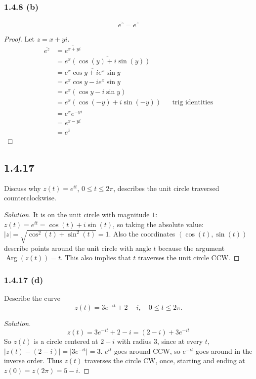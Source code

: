 \documentclass{article}
\newenvironment{solution}{
\begin{proof}[Solution]}{
\end{proof}}
\begin{document}
\subsubsection*{1.4.8 (b)}
\[
  \overline{e^z} = e^{\bar{z}}
\]
\begin{proof}
  Let $z = x + yi$.
  \begin{align*}
    \overline{e^z} &= \overline{e^{x + yi}}
    \\ &= \overline{e^x(\cos(y) + i\sin(y))}
    \\ &= \overline{e^x \cos y + i e^x \sin y}
    \\ &= e^x \cos y - i e^x \sin y
    \\ &= e^x(\cos y - i \sin y)
    \\ &= e^x(\cos (-y) + i \sin(-y))
    && \text{trig identities}
    \\ &= e^x e^{-yi}
    \\ &= e^{x - yi}
    \\ &= e^{\overline{z}}
  \end{align*}
\end{proof}

\subsection*{1.4.17}
Discuss why $z(t) = e^{it}$, $0 \le t \le 2\pi$, describes the unit circle traversed counterclockwise.
\begin{solution}
  It is on the unit circle with magnitude $1$:
  $z(t)=e^{it}=\cos(t)+i\sin(t)$, so taking the absolute value: $\lvert z \rvert=\sqrt{\cos^2(t)+\sin^2(t)}=1$.
  Also the coordinates $(\cos(t),\sin(t))$ describe points around the unit circle with angle $t$ because the argument $\operatorname{Arg}(z(t))=t$. This also implies that $t$ traverses the unit circle CCW.
\end{solution}

\subsubsection*{1.4.17 (d)}
Describe the curve
\[
  z(t) = 3e^{-it} + 2 - i, \quad 0 \le t \le 2\pi.
\]
\begin{solution}
  \[
    z(t) = 3e^{-it} + 2 - i = (2 - i) + 3e^{-it}
  \]
  So $z(t)$ is a circle centered at $2 - i$ with radius $3$, since at every $t$, $\lvert z(t) - (2 - i) \rvert=\lvert 3e^{-it} \rvert=3$.
  $e^{it}$ goes around CCW, so $e^{-it}$ goes around in the inverse order. Thus $z(t)$ traverses the circle CW, once, starting and ending at $z(0) = z(2\pi) = 5 - i$.
\end{solution}
\end{document}
